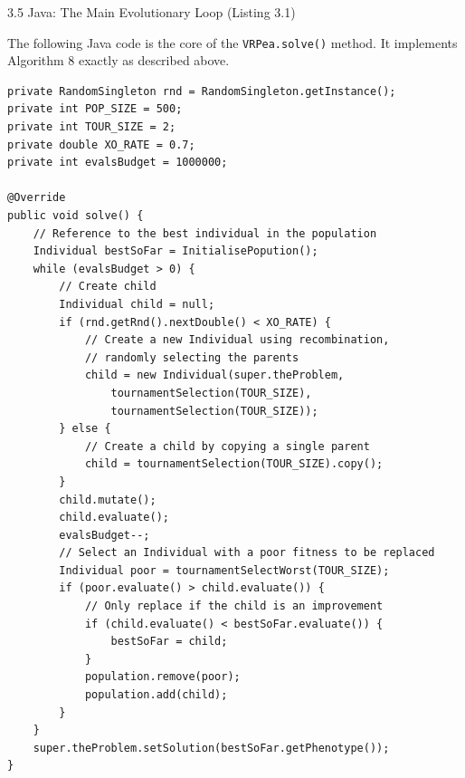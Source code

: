 \documentclass[aspectratio=169,10pt]{beamer}
\begin{document}
\begin{frame}[fragile]{3.5 Java: The Main Evolutionary Loop (Listing 3.1)}

  The following Java code is the core of the \texttt{VRPea.solve()} method.
  It implements Algorithm 8 exactly as described above.

  \begin{lstlisting}[style=javastyle,caption={Listing 3.1 -- The evolutionary algorithm (VRPea.solve())}]
private RandomSingleton rnd = RandomSingleton.getInstance();
private int POP_SIZE = 500;
private int TOUR_SIZE = 2;
private double XO_RATE = 0.7;
private int evalsBudget = 1000000;

@Override
public void solve() {
    // Reference to the best individual in the population
    Individual bestSoFar = InitialisePopution();
    while (evalsBudget > 0) {
        // Create child
        Individual child = null;
        if (rnd.getRnd().nextDouble() < XO_RATE) {
            // Create a new Individual using recombination,
            // randomly selecting the parents
            child = new Individual(super.theProblem,
                tournamentSelection(TOUR_SIZE),
                tournamentSelection(TOUR_SIZE));
        } else {
            // Create a child by copying a single parent
            child = tournamentSelection(TOUR_SIZE).copy();
        }
        child.mutate();
        child.evaluate();
        evalsBudget--;
        // Select an Individual with a poor fitness to be replaced
        Individual poor = tournamentSelectWorst(TOUR_SIZE);
        if (poor.evaluate() > child.evaluate()) {
            // Only replace if the child is an improvement
            if (child.evaluate() < bestSoFar.evaluate()) {
                bestSoFar = child;
            }
            population.remove(poor);
            population.add(child);
        }
    }
    super.theProblem.setSolution(bestSoFar.getPhenotype());
}
  \end{lstlisting}

\end{frame}
\end{document}
